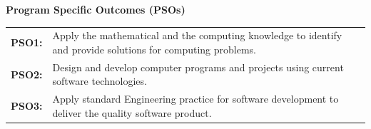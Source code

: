\vspace{0.8cm}
\begin{center}
  {\fontsize{16pt}{20pt}\selectfont\bfseries Program Specific Outcomes (PSOs)\par}
\end{center}
\vspace{0.4cm}

\begin{table}[H]
  \centering
  \fontsize{13pt}{18pt}\selectfont
  \begin{tabularx}{\textwidth}{@{}p{2.2cm} L@{}}
    \textbf{PSO1:} & Apply the mathematical and the computing knowledge to identify and provide solutions for computing problems. \\[10pt]
    \textbf{PSO2:} & Design and develop computer programs and projects using current software technologies. \\[10pt]
    \textbf{PSO3:} & Apply standard Engineering practice for software development to deliver the quality software product.
  \end{tabularx}
\end{table}
\newpage

